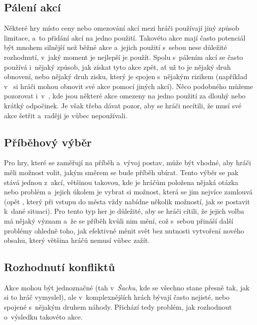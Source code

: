 \subsection{Pálení akcí}
\label{subsec:actions_burning_actions}

Některé hry místo ceny nebo omezování akcí mezi hráči používají jiný způsob limitace, a~to přidání akcí na jedno použití. Takovéto akce mají často potenciál být mnohem silnější než běžné akce a~jejich použití s~sebou nese důležité rozhodnutí, v~jaký moment je nejlepší je použít. Spolu s~pálením akcí se často používá i~nějaký způsob, jak získat tyto akce zpět, ať už to je nějaký druh obnovení, nebo nějaký druh zisku, který je spojen s~nějakým rizikem (například v~ si hráči mohou obnovit své akce pomocí jiných akcí). Něco podobného můžeme pozorovat i~v~, kde jsou některé akce omezeny na jedno použití za dlouhý nebo krátký odpočinek. Je však třeba dávat pozor, aby se hráči necítili, že musí své akce šetřit a~raději je vůbec nepoužívali.

\subsection{Příběhový výběr}
\label{subsec:actions_story_choice}

Pro hry, které se zaměřují na příběh a~vývoj postav, může být vhodné, aby hráči měli možnost volit, jakým směrem se bude příběh ubírat. Tento výběr se pak stává jednou z~akcí, většinou takovou, kde je hráčům položena nějaká otázka nebo problém a~jejich úkolem je vybrat si možnost, která se jim nejvíce zamlouvá (opět , který při vstupu do města vždy nabídne několik možností, jak se postavit k~dané situaci). Pro tento typ her je důležité, aby se hráči cítili, že jejich volba má nějaký význam a~že se příběh kvůli nim mění, což s~sebou přináší další problémy ohledně toho, jak efektivně měnit svět bez nutnosti vytvoření nového obsahu, který většina hráčů nemusí vůbec zažít.

\subsection{Rozhodnutí konfliktů}
\label{subsec:actions_action_resolution}

Akce mohou být jednoznačné (tah v~\textit{Šachu}, kde se všechno stane přesně tak, jak si to hráč vymyslel), ale v~komplexnějších hrách bývají často nejisté, nebo spojené s~nějakým druhem náhody. Přichází tedy problém, jak rozhodnout o~výsledku takovéto akce.

